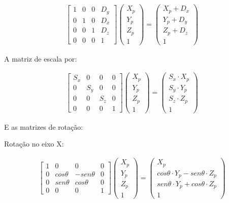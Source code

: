 {\begin{align}
\left[\begin{array}{cccc}
1 & 0 & 0 & D_y\\
0 & 1 & 0 & D_x\\
0 & 0 & 1 & D_z\\
0 & 0 & 0 & 1
\end{array}\right]
\left(\begin{array}{c}
X_p\\
Y_p\\
Z_p\\
1
\end{array}\right) =
\left(\begin{array}{c}
X_p + D_x\\
Y_p + D_y\\
Z_p + D_z\\
1
\end{array}\right)
\label{eq:rend_translationMat}
\end{align}

A matriz de escala por:

\begin{align}
\left[\begin{array}{cccc}
S_x & 0 & 0 & 0\\
0 & S_y & 0 & 0\\
0 & 0 & S_z & 0\\
0 & 0 & 0 & 1
\end{array}\right]
\left(\begin{array}{c}
X_p\\
Y_p\\
Z_p\\
1
\end{array}\right) =
\left(\begin{array}{c}
S_x \cdot X_p\\
S_y \cdot Y_p\\
S_z \cdot Z_p\\
1
\end{array}\right)
\label{eq:rend_scaleMat}
\end{align}

E as matrizes de rotação:

Rotação no eixo X:

\begin{align}
\left[\begin{array}{cccc}
1 & 0 & 0 & 0\\
0 & cos\theta & -sen\theta & 0\\
0 & sen\theta & cos\theta & 0\\
0 & 0 & 0 & 1
\end{array}\right]
\left(\begin{array}{c}
X_p\\
Y_p\\
Z_p\\
1
\end{array}\right) =
\left(\begin{array}{c}
X_p\\
cos\theta \cdot Y_p - sen\theta \cdot Z_p\\
sen\theta \cdot Y_p + cos\theta \cdot Z_p\\
1
\end{array}\right)
\label{eq:rend_rotationMatX}
\end{align}

}
